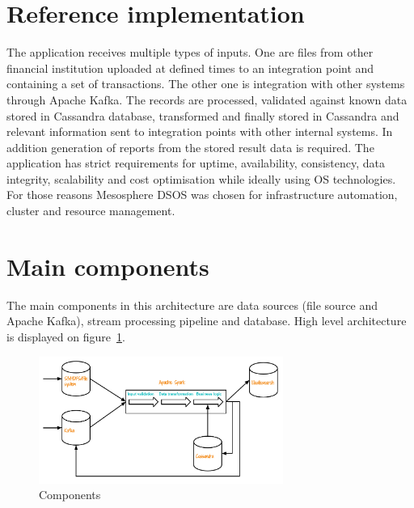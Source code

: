 \documentclass[a4paper, 10 pt, conference]{IEEEtran}
\begin{document}
\section{Reference implementation}

The application receives multiple types of inputs. One are files from other financial institution uploaded at defined times to an integration point and containing a set of transactions. The other one is integration with other systems through Apache Kafka. The records are processed, validated against known data stored in Cassandra database, transformed and finally stored in Cassandra and relevant information sent to integration points with other internal systems. In addition generation of reports from the stored result data is required. The application has strict requirements for uptime, availability, consistency, data integrity, scalability and cost optimisation while ideally using OS technologies. For those reasons Mesosphere DSOS was chosen for infrastructure automation, cluster and resource management.

\section{Main components}

The main components in this architecture are data sources (file source and Apache Kafka), stream processing pipeline and database. High level architecture is displayed on figure~\ref{fig:components}. 

\begin{figure}[hb]
	\begin{center}
		\caption{Components}
		\label{fig:components}
		\includegraphics[width=8cm,keepaspectratio]{architecture-diagram.png}
	\end{center}
\end{figure}
\end{document}
